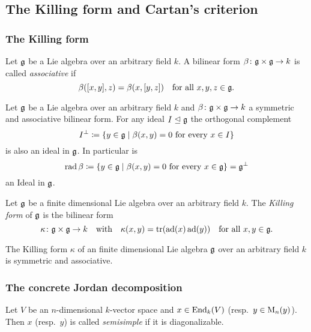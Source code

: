 \subsection{The Killing form and Cartan’s criterion}



\subsubsection{The Killing form}




\begin{defi}
 Let $\mathfrak{g}$ be a Lie algebra over an arbitrary field $k$. A bilinear form $\beta \colon \mathfrak{g} \times \mathfrak{g} \to k$ is called \emph{associative} if
 \[
  \beta([x,y],z) = \beta(x,[y,z])
  \quad \text{for all $x,y,z \in \mathfrak{g}$}.
 \]
\end{defi}


\begin{lem}
 Let $\mathfrak{g}$ be a Lie algebra over an arbitrary field $k$ and \mbox{$\beta \colon \mathfrak{g} \times \mathfrak{g} \to k$} a symmetric and associative bilinear form. For any ideal $I \trianglelefteq \mathfrak{g}$ the orthogonal complement
 \[
  I^\perp \coloneqq \{y \in \mathfrak{g} \mid \text{$\beta(x,y) = 0$ for every $x \in I$}\}
 \]
 is also an ideal in $\mathfrak{g}$. In particular is
 \[
  \operatorname{rad} \beta \coloneqq \{y \in \mathfrak{g} \mid \text{$\beta(x,y) = 0$ for every $x \in \mathfrak{g}$}\} = \mathfrak{g}^\perp
 \]
 an Ideal in $\mathfrak{g}$.
\end{lem}


\begin{defi}
 Let $\mathfrak{g}$ be a finite dimensional Lie algebra over an arbitrary field $k$. The \emph{Killing form} of $\mathfrak{g}$ is the bilinear form
 \[
  \kappa \colon \mathfrak{g} \times \mathfrak{g} \to k
  \quad\text{with}\quad
  \kappa(x,y) = \operatorname{tr}(\operatorname{ad}(x) \operatorname{ad}(y))
  \quad\text{for all $x,y \in \mathfrak{g}$}.
 \]
\end{defi}


\begin{lem}
 The Killing form $\kappa$ of an finite dimensional Lie algebra $\mathfrak{g}$ over an arbitrary field $k$ is symmetric and associative.
\end{lem}



\subsubsection{The concrete Jordan decomposition}


\begin{defi}
 Let $V$ be an $n$-dimensional $k$-vector space and $x \in \operatorname{End}_k(V)$ (resp.\ $y \in \operatorname{M}_n(y)$). Then $x$ (resp.\ $y$) is called \emph{semisimple} if it is diagonalizable.
\end{defi}


